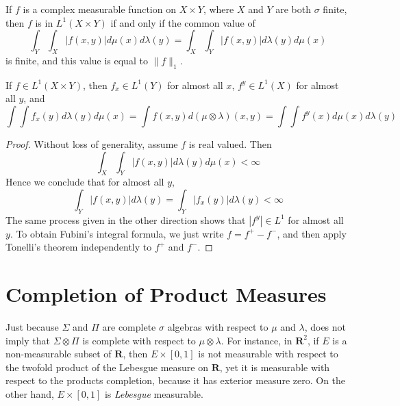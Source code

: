 \begin{corollary}
    If $f$ is a complex measurable function on $X \times Y$, where $X$ and $Y$ are both $\sigma$ finite, then $f$ is in $L^1(X \times Y)$ if and only if the common value of
    \[ \int_Y \int_X |f(x,y)| d\mu(x) d\lambda(y) = \int_X \int_Y |f(x,y)| d\lambda(y) d\mu(x) \]
    is finite, and this value is equal to $\| f \|_1$.
\end{corollary}

\begin{theorem}[Fubini]
    If $f \in L^1(X \times Y)$, then $f_x \in L^1(Y)$ for almost all $x$, $f^y \in L^1(X)$ for almost all $y$, and
    \[ \int \int f_x(y) d\lambda(y) d\mu(x) = \int f(x,y) d(\mu \otimes \lambda)(x,y) = \int \int f^y(x) d\mu(x) d\lambda(y) \]
\end{theorem}
\begin{proof}
    Without loss of generality, assume $f$ is real valued. Then
    \[ \int_X \int_Y |f(x,y)| d\lambda(y) d\mu(x) < \infty \]
    Hence we conclude that for almost all $y$,
    \[ \int_Y |f(x,y)| d\lambda(y) = \int_Y |f_x(y)| d\lambda(y) < \infty \]
    The same process given in the other direction shows that $|f^y| \in L^1$ for almost all $y$. To obtain Fubini's integral formula, we just write $f = f^+ - f^-$, and then apply Tonelli's theorem independently to $f^+$ and $f^-$.
\end{proof}

\section{Completion of Product Measures}

Just because $\Sigma$ and $\Pi$ are complete $\sigma$ algebras with respect to $\mu$ and $\lambda$, does not imply that $\Sigma \otimes \Pi$ is complete with respect to $\mu \otimes \lambda$. For instance, in $\mathbf{R}^2$, if $E$ is a non-measurable subset of $\mathbf{R}$, then $E \times [0,1]$ is not measurable with respect to the twofold product of the Lebesgue measure on $\mathbf{R}$, yet it is measurable with respect to the products completion, because it has exterior measure zero. On the other hand, $E \times [0,1]$ is {\it Lebesgue} measurable.

